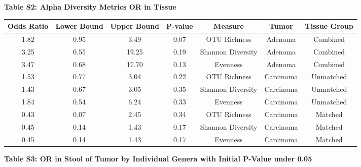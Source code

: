 \documentclass[12pt,]{article}
\begin{document}
\newpage

\textbf{Table S2: Alpha Diversity Metrics OR in Tissue}

\footnotesize

\begin{longtable}[]{@{}ccccccc@{}}
\toprule
Odds Ratio & Lower Bound & Upper Bound & P-value & Measure & Tumor &
Tissue Group\tabularnewline
\midrule
\endhead
1.82 & 0.95 & 3.49 & 0.07 & OTU Richness & Adenoma &
Combined\tabularnewline
3.25 & 0.55 & 19.25 & 0.19 & Shannon Diversity & Adenoma &
Combined\tabularnewline
3.47 & 0.68 & 17.70 & 0.13 & Evenness & Adenoma &
Combined\tabularnewline
1.53 & 0.77 & 3.04 & 0.22 & OTU Richness & Carcinoma &
Unmatched\tabularnewline
1.43 & 0.67 & 3.05 & 0.35 & Shannon Diversity & Carcinoma &
Unmatched\tabularnewline
1.84 & 0.54 & 6.24 & 0.33 & Evenness & Carcinoma &
Unmatched\tabularnewline
0.43 & 0.07 & 2.45 & 0.34 & OTU Richness & Carcinoma &
Matched\tabularnewline
0.45 & 0.14 & 1.43 & 0.17 & Shannon Diversity & Carcinoma &
Matched\tabularnewline
0.45 & 0.14 & 1.43 & 0.17 & Evenness & Carcinoma &
Matched\tabularnewline
\bottomrule
\end{longtable}

\normalsize

\newpage

\textbf{Table S3: OR in Stool of Tumor by Individual Genera with Initial
P-Value under 0.05}

\footnotesize
\end{document}
